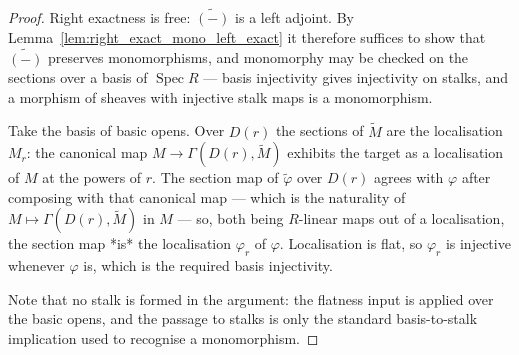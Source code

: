 \begin{proof}\leanok
  Right exactness is free: \(\widetilde{(-)}\) is a left adjoint. By
  Lemma~\ref{lem:right_exact_mono_left_exact} it therefore suffices to show that
  \(\widetilde{(-)}\) preserves monomorphisms, and monomorphy may be checked on the sections
  over a basis of \(\operatorname{Spec} R\) --- basis injectivity gives injectivity on stalks,
  and a morphism of sheaves with injective stalk maps is a monomorphism.

  Take the basis of basic opens. Over \(D(r)\) the sections of \(\widetilde{M}\) are the
  localisation \(M_r\): the canonical map \(M \to \Gamma(D(r), \widetilde{M})\) exhibits the
  target as a localisation of \(M\) at the powers of \(r\). The section map of
  \(\widetilde{\varphi}\) over \(D(r)\) agrees with \(\varphi\) after composing with that
  canonical map --- which is the naturality of \(M \mapsto \Gamma(D(r), \widetilde{M})\) in
  \(M\) --- so, both being \(R\)-linear maps out of a localisation, the section map *is* the
  localisation \(\varphi_r\) of \(\varphi\). Localisation is flat, so \(\varphi_r\) is injective
  whenever \(\varphi\) is, which is the required basis injectivity.

  Note that no stalk is formed in the argument: the flatness input is applied over the basic
  opens, and the passage to stalks is only the standard basis-to-stalk implication used to
  recognise a monomorphism.
\end{proof}

